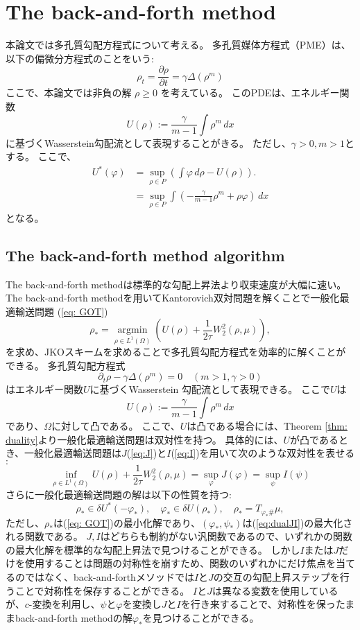 \chapter{The back-and-forth method} 
\label{ch:The back-and-forth method}
本論文では多孔質勾配方程式について考える。
多孔質媒体方程式（PME）は、以下の偏微分方程式のことをいう$:$
\[
\rho_t = \frac{{\partial \rho}}{{\partial t}} = \gamma\Delta (\rho^m)
\]
ここで、本論文では非負の解 \(\rho \geq 0\) を考えている。
このPDEは、エネルギー関数
\[
    U(\rho) := \frac{\gamma}{{m-1}} \int \rho^m \, dx
\]
に基づくWasserstein勾配流として表現することがきる。
ただし、$\gamma > 0, m > 1$とする。
ここで、
\begin{align*}
    U^*(\varphi) &= \sup_{\rho \in P} \left( \int \varphi \, d\rho - U(\rho) \right).\\
                &= \sup_{\rho \in P} \int \left(- \frac{\gamma}{m-1}\rho^m + \rho\varphi\right) \, dx
\end{align*}
となる。

\section{The back-and-forth method algorithm}
\label{sect:The back-and-forth method algorithm}
The back-and-forth methodは標準的な勾配上昇法より収束速度が大幅に速い。
The back-and-forth methodを用いてKantorovich双対問題を解くことで一般化最適輸送問題
(\ref{eq: GOT})
\begin{equation*}
        \rho_* = \underset{\rho \in L^1(\Omega)} {\operatorname{argmin}} \left( U(\rho) + \frac{1}{2 \tau}W_2^2(\rho, \mu) \right), 
\end{equation*}
を求め、JKOスキームを求めることで多孔質勾配方程式を効率的に解くことができる。
多孔質勾配方程式
\[
    \partial_t \rho - \gamma\Delta(\rho^m) = 0  \quad(m > 1, \gamma > 0)
\]
はエネルギー関数$U$に基づくWasserstein 勾配流として表現できる。
ここで$U$は
\[
    U(\rho) := \frac{\gamma}{{m-1}} \int \rho^m \, dx
\]
であり、$\Omega$に対して凸である。
ここで、$U$は凸である場合には、Theorem \ref{thm: duality}より一般化最適輸送問題は双対性を持つ。
具体的には、$U$が凸であるとき、一般化最適輸送問題は$J$(\ref{eq:J})と$I$(\ref{eq:I})を用いて次のような双対性を表せる$:$
$$
    \inf_{\rho \in L^1(\Omega)} U(\rho) + \frac{1}{2 \tau} W^2_2(\rho, \mu) = \sup_\varphi J(\varphi) = \sup_\psi I (\psi)
$$
さらに一般化最適輸送問題の解は以下の性質を持つ$:$
\begin{equation}
    \label{eq:dualJI}
    \rho_* \in \delta U^*(- \varphi_*), \quad \varphi_* \in \delta U(\rho_*), \quad \rho_* = T_{\varphi_* \#} \mu,
\end{equation}
ただし、$\rho_*$は(\ref{eq: GOT})の最小化解であり、$(\varphi_*, \psi_*)$は(\ref{eq:dualJI})の最大化される関数である。
$J, I$はどちらも制約がない汎関数であるので、いずれかの関数の最大化解を標準的な勾配上昇法で見つけることができる。
しかし$I$または$J$だけを使用することは問題の対称性を崩すため、関数のいずれかにだけ焦点を当てるのではなく、back-and-forthメソッドでは$I$と$J$の交互の勾配上昇ステップを行うことで対称性を保存することができる。
$I$と$J$は異なる変数を使用しているが、$c$-変換を利用し、$\psi$と$\varphi$を変換し$J$と$I$を行き来することで、対称性を保ったままback-and-forth methodの解$\varphi_*$を見つけることができる。 


